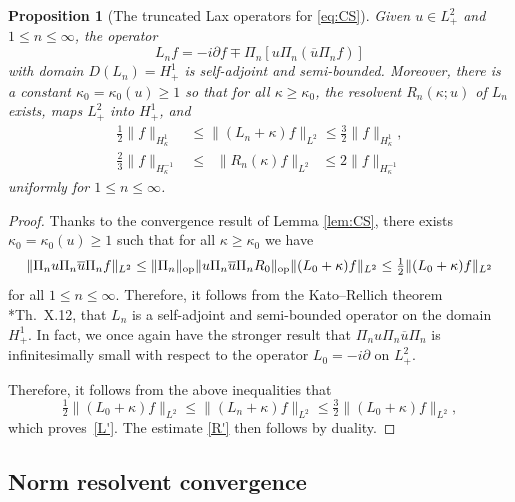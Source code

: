 \documentclass [11pt] {article}
\newtheorem{prop}[thm]{Proposition}
\newcommand{\<}{\langle}
\renewcommand{\>}{\rangle}
\newcommand{\ol}[1]{\overline{#1}}
\newcommand{\op}{\textup{op}}
\begin{document}
\begin{prop}[The truncated Lax operators for \eqref{eq:CS}]
\label{prop:lax'}
Given $u\in L^2_+$ and $1\leq n\leq \infty$, the operator
\begin{equation*}
L_n f = -i\partial f \mp \Pi_n [ u \Pi_n (\ol{u} \Pi_nf) ]
\end{equation*}
with domain $D(L_n) = H^1_+$ is self-adjoint and semi-bounded.  Moreover, there is a constant $\kappa_0 = \kappa_0(u) \geq 1$ so that for all $\kappa\geq\kappa_0$, the resolvent $R_n(\kappa;u)$ of $L_n$ exists, maps $L^2_+$ into $H^{1}_+$, and 
\begin{align}
\tfrac12\|f\|_{H^1_\kappa} &\le \| (L_n+\kappa)f \|_{L^2} \le \tfrac32 \|f\|_{H^1_\kappa} ,
\label{L'} \\
\tfrac23\| f\|_{H^{-1}_\kappa} &\le\;\; \| R_n(\kappa)f \|_{L^2}\;\; \le2 \| f\|_{H^{-1}_\kappa}
\label{R'}
\end{align}
uniformly for $1\leq n\leq \infty$.
\end{prop}
\begin{proof}
Thanks to the convergence result of Lemma \ref{lem:CS}, there exists $\kappa_0 = \kappa_0(u) \geq 1$ such that for all $\kappa\geq\kappa_0$ we have
\begin{equation*}
\| \Pi_nu\Pi_n\ol{u}\Pi_n f \|_{L^2}
\leq \| \Pi_n \|_{\op} \| u\Pi_n\ol{u}\Pi_n R_0 \|_{\op} \| (L_0+\kappa)f\|_{L^2}
\leq \tfrac{1}{2} \| (L_0+\kappa)f\|_{L^2} 
\end{equation*}
for all $1\leq n\leq \infty$. 
 Therefore, it follows from the Kato--Rellich theorem \cite{ReedSimonvol2}*{Th.~X.12}, that $L_n$ is a self-adjoint and semi-bounded operator on the domain $H^1_+$. In fact, we once again have the stronger result that $\Pi_nu\Pi_n\ol{u}\Pi_n$ is infinitesimally small with respect to the operator $L_0 = -i\partial$ on $L^2_+$. 

 Therefore, it follows from the above inequalities that 
\begin{equation*}
\tfrac{1}{2} \| (L_0+\kappa)f\|_{L^2}
\leq \| (L_n+\kappa)f\|_{L^2}
\leq \tfrac{3}{2} \| (L_0+\kappa)f\|_{L^2} ,
\end{equation*}
which proves~\eqref{L'}.  The estimate \eqref{R'} then follows by duality.
\end{proof}

\subsection{Norm resolvent convergence}\label{sec:norm-res-cv}
\end{document}
